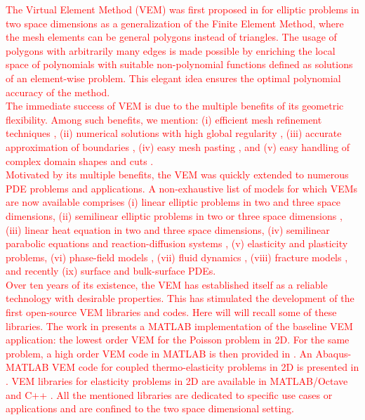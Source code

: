 \documentclass[a4paper]{article}
\newcommand{\red}[1]{\textcolor{red}{#1}}
\begin{document}
\red{The Virtual Element Method (VEM) was first proposed in \cite{beirao2013basic} for elliptic problems in two space dimensions as a generalization of the Finite Element Method, where the mesh elements can be general polygons instead of triangles.  The usage of polygons with arbitrarily many edges is made possible by enriching the local space of polynomials with suitable non-polynomial functions defined as solutions of an element-wise problem.  This elegant idea ensures the optimal polynomial accuracy of the method.\\
The immediate success of VEM is due to the multiple benefits of its geometric flexibility. Among such benefits, we mention: (i) efficient mesh refinement techniques \cite{cangiani2017posteriori, van2022mesh}, (ii) numerical solutions with high global regularity \cite{da2020c1,da2014virtual}, (iii) accurate approximation of boundaries 
\cite{da2019virtual, bertoluzza2019high, dassi2022bend},  (iv) easy mesh pasting \cite{da2018virtual, frittelli2018virtual}, and (v) easy handling of complex domain shapes and cuts \cite{benedetto2014virtual, dassi2022virtual}.\\
Motivated by its multiple benefits, the VEM was quickly extended to numerous PDE problems and applications. A non-exhaustive list of models for which VEMs are now available comprises (i) linear elliptic problems in two \cite{beirao2013basic, da2019virtual} and three \cite{da2017high} space dimensions,  (ii) semilinear elliptic problems in two or three space dimensions \cite{xiao2022nonconforming}, (iii) linear heat equation in two \cite{vacca2015virtual} and three \cite{zhao2019nonconforming} space dimensions, (iv) semilinear parabolic equations \cite{adak2019convergence} and reaction-diffusion systems \cite{huang2021posteriori}, (v) elasticity \cite{da2013virtual, gain2014virtual} and plasticity \cite{aldakheel2019virtual} problems,  (vi) phase-field models \cite{aldakheel2018phase, antonietti2016c}, (vii) fluid dynamics \cite{adak2021virtual, beirao2019stokes},
(viii) fracture models \cite{benedetto2014virtual},  and recently
(ix) surface \cite{bachini2021arbitrary, frittelli2018virtual} and bulk-surface \cite{frittelli2021bulk,  frittelli2023bsrds} PDEs.\\
%
Over ten years of its existence, the VEM has established itself as a reliable technology with desirable properties. This has stimulated the development of the first open-source VEM libraries and codes.  Here will will recall some of these libraries.  The  work in \cite{Sutton_2016} presents a MATLAB implementation of the baseline VEM application: the lowest order VEM for the Poisson problem in 2D. For the same problem, a high order VEM code in MATLAB is then provided in \cite{Herrera_2022}. An Abaqus-MATLAB VEM code for coupled thermo-elasticity problems in 2D is presented in \cite{Dhanush_2018}.  VEM libraries for elasticity problems in 2D are available in MATLAB/Octave \cite{VEMLAB} and C++ \cite{Ortiz_Bernardin_2019}. All the mentioned libraries are dedicated to specific use cases or applications and are confined to the two space dimensional setting. \\
}
\end{document}
